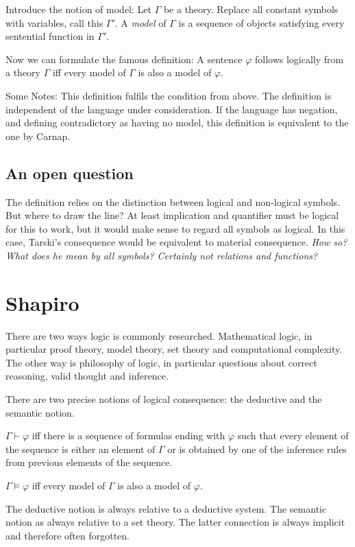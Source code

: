 \documentclass[a4paper]{article}
\begin{document}
Introduce the notion of model:  Let $\Gamma$ be a theory. Replace all constant
symbols with variables, call this $\Gamma'$.  A \emph{model} of $\Gamma$ is a
sequence of objects satisfying every sentential function in $\Gamma'$.

Now we can formulate the famous definition: A sentence $\varphi$ follows
logically from a theory $\Gamma$ iff every model of $\Gamma$ is also a model of
$\varphi$.

Some Notes: This definition fulfils the condition from above.  The definition is
independent of the language under consideration.  If the language has negation,
and defining contradictory as having no model, this definition is equivalent to
the one by Carnap.

\subsection{An open question}

The definition relies on the distinction between logical and non-logical
symbols.  But where to draw the line?  At least implication and quantifier must
be logical for this to work, but it would make sense to regard all symbols as
logical.  In this case, Tarski's consequence would be equivalent to material
consequence.  \emph{How so? What does he mean by \emph{all symbols}? Certainly
not relations and functions?}

\section{Shapiro}

There are two ways logic is commonly researched.  Mathematical logic, in
particular proof theory, model theory, set theory and computational complexity.
The other way is philosophy of logic, in particular questions about correct
reasoning, valid thought and inference.

There are two precise notions of logical consequence: the deductive and the
semantic notion.

$\Gamma \vdash \varphi$ iff there is a sequence of formulas ending with
$\varphi$ such that every element of the sequence is either an element of
$\Gamma$ or is obtained by one of the inference rules from previous elements of
the sequence.

$\Gamma \models \varphi$ iff every model of $\Gamma$ is also a model of
$\varphi$.

The deductive notion is always relative to a deductive system.  The semantic
notion as always relative to a set theory.  The latter connection is always
implicit and therefore often forgotten.
\end{document}
